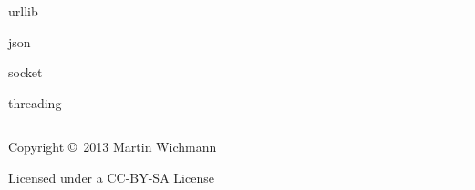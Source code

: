 \begin{multicols}{3}
    \begin{cschapter}{urllib}
        \csitem{}{}
    \end{cschapter}

    \begin{cschapter}{json}
        \csitem{}{}
    \end{cschapter}

    \begin{cschapter}{socket}
        \csitem{}{}
    \end{cschapter}

    \begin{cschapter}{threading}
        \csitem{}{}
    \end{cschapter}


    \rule{0.3\linewidth}{0.25pt}
    \scriptsize

    Copyright \copyright\ 2013 Martin Wichmann

    Licensed under a CC-BY-SA License

\end{multicols}




